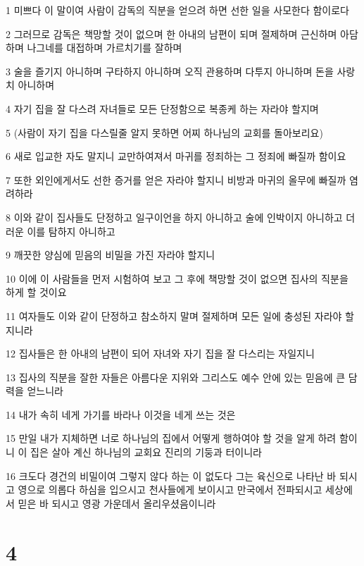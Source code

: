 \par 1 미쁘다 이 말이여 사람이 감독의 직분을 얻으려 하면 선한 일을 사모한다 함이로다
\par 2 그러므로 감독은 책망할 것이 없으며 한 아내의 남편이 되며 절제하며 근신하며 아담하며 나그네를 대접하며 가르치기를 잘하며
\par 3 술을 즐기지 아니하며 구타하지 아니하며 오직 관용하며 다투지 아니하며 돈을 사랑치 아니하며
\par 4 자기 집을 잘 다스려 자녀들로 모든 단정함으로 복종케 하는 자라야 할지며
\par 5 (사람이 자기 집을 다스릴줄 알지 못하면 어찌 하나님의 교회를 돌아보리요)
\par 6 새로 입교한 자도 말지니 교만하여져서 마귀를 정죄하는 그 정죄에 빠질까 함이요
\par 7 또한 외인에게서도 선한 증거를 얻은 자라야 할지니 비방과 마귀의 올무에 빠질까 염려하라
\par 8 이와 같이 집사들도 단정하고 일구이언을 하지 아니하고 술에 인박이지 아니하고 더러운 이를 탐하지 아니하고
\par 9 깨끗한 양심에 믿음의 비밀을 가진 자라야 할지니
\par 10 이에 이 사람들을 먼저 시험하여 보고 그 후에 책망할 것이 없으면 집사의 직분을 하게 할 것이요
\par 11 여자들도 이와 같이 단정하고 참소하지 말며 절제하며 모든 일에 충성된 자라야 할지니라
\par 12 집사들은 한 아내의 남편이 되어 자녀와 자기 집을 잘 다스리는 자일지니
\par 13 집사의 직분을 잘한 자들은 아름다운 지위와 그리스도 예수 안에 있는 믿음에 큰 담력을 얻느니라
\par 14 내가 속히 네게 가기를 바라나 이것을 네게 쓰는 것은
\par 15 만일 내가 지체하면 너로 하나님의 집에서 어떻게 행하여야 할 것을 알게 하려 함이니 이 집은 살아 계신 하나님의 교회요 진리의 기둥과 터이니라
\par 16 크도다 경건의 비밀이여 그렇지 않다 하는 이 없도다 그는 육신으로 나타난 바 되시고 영으로 의롭다 하심을 입으시고 천사들에게 보이시고 만국에서 전파되시고 세상에서 믿은 바 되시고 영광 가운데서 올리우셨음이니라

\chapter{4}


